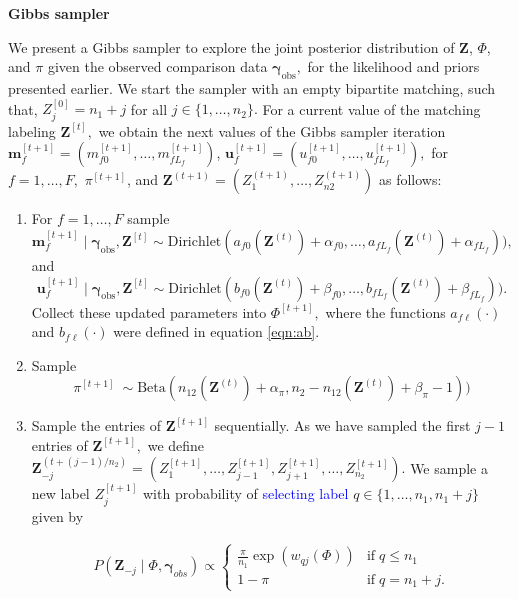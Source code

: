 \documentclass{article}
\newcommand{\bam}{\boldsymbol{m}}
\newcommand{\bu}{\boldsymbol{u}}
\newcommand{\bZ}{\boldsymbol{Z}}
\newcommand{\bgamma}{\boldsymbol{\gamma}}
\begin{document}
\begin{enumerate}
\newpage
\textbf{Gibbs sampler}

We present a Gibbs sampler to explore the joint posterior distribution of $\bZ$, $\Phi$, and $\pi$ given the observed comparison data $\bgamma_{\text{obs}},$ for the likelihood and priors presented earlier. 
We start the sampler with an empty bipartite matching, such that, $Z_{j}^{[0]} = n_1 + j$ for all $j \in \{1, \ldots, n_2 \}.$ For a current value of the matching labeling $\bZ^{[t]},$ we obtain the next values of the Gibbs sampler iteration 
$\bam_f^{[t+1]} = (m_{f0}^{[t+1]}, \ldots, m_{f L_f}^{[t+1]})$, 
$\bu_f^{[t+1]} =  (u_{f0}^{[t+1]}, \ldots, u_{f L_f}^{[t+1]}),$ for $f=1, \ldots, F,$ 
$\pi^{[t+1]}$, and $\bZ^{(t+1)} = (Z_1^{(t+1)}, \ldots, Z_{n2}^{(t+1)})$ as follows:

\begin{enumerate}
\item For $f=1, \ldots, F$ sample
$$\bam_f^{[t+1]} \mid \bgamma_{\text{obs}}, \bZ^{[t]} \sim
\text{Dirichlet}(
a_{f0}(\bZ^{(t)})  + \alpha_{f0}, \ldots, a_{f L_f}(\bZ^{(t)} ) + \alpha_{f L_f})
),
$$
and
$$\bu_f^{[t+1]} \mid \bgamma_{\text{obs}}, \bZ^{[t]} \sim
\text{Dirichlet}(
b_{f0}(\bZ^{(t)})  + \beta_{f0}, \ldots, b_{f L_f}(\bZ^{(t)} ) + \beta_{f L_f})
). 
$$
Collect these updated parameters into $\Phi^{[t+1]},$ where the functions $a_{f \ell}(\cdot)$ and $b_{f \ell}(\cdot)$ were defined in equation \ref{eqn:ab}. 
\item Sample $$\pi^{[t+1]} \
\sim \text{Beta}(
n_{12}(\bZ^{(t)} )+ \alpha_{\pi}, n_2 - n_{12}(\bZ^{(t)}) + \beta_{\pi} - 1)
)
$$
\item Sample the entries of $\bZ^{[t+1]}$ sequentially. As we have sampled the first $j-1$ entries of $\bZ^{[t+1]},$ we define 
$\bZ_{-j}^{(t + (j-1)/n_2)} = (
Z_{1}^{[t+1]}, \ldots, Z_{j-1}^{[t+1]}, Z_{j+1}^{[t+1]}, \ldots, Z_{n_2}^{[t+1]}
).
$
We sample a new label $Z_{j}^{[t+1]}$ with probability of \textcolor{blue}{selecting label} $q \in \{1, \ldots, n_1, n_1 + j \}$ given by 

\begin{align}
P(\bZ_{-j} \mid \Phi, \bgamma_{obs}) \propto 
\begin{cases}
\frac{\pi}{n_1}\exp(w_{qj}(\Phi) )  & \text{if} \; q \leq n_1 \\
1- \pi
   &  \text{if} \; q = n_1 + j.
\end{cases}
\end{align}
\end{enumerate}


\end{enumerate}
\end{document}
